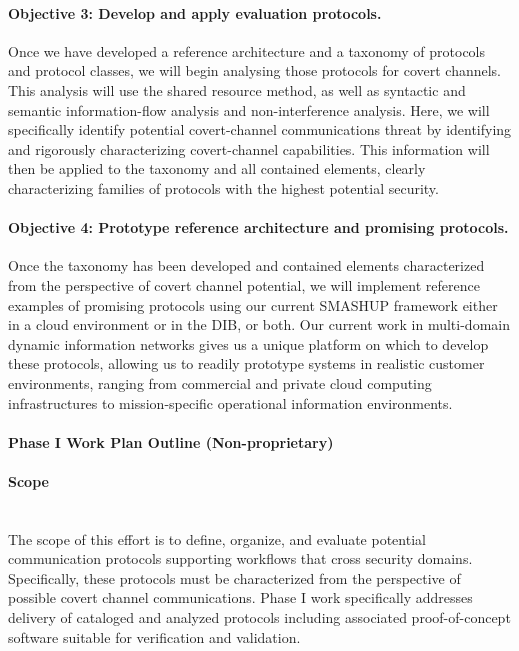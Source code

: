 \documentclass{sbir}
\begin{document}
\paragraph{Objective 3: Develop and apply evaluation protocols.} Once we have developed a reference architecture and a taxonomy of protocols and protocol classes, we will begin analysing those protocols for covert channels. This analysis will use the shared resource method, as well as syntactic and semantic information-flow analysis and non-interference analysis. Here, we will specifically identify potential covert-channel communications threat by identifying and rigorously characterizing covert-channel capabilities. This information will then be applied to the taxonomy and all contained elements, clearly characterizing families of protocols with the highest potential security.

\paragraph{Objective 4: Prototype reference architecture and promising protocols.}  Once the taxonomy has been developed and contained elements characterized from the perspective of covert channel potential, we will implement reference examples of promising protocols using our current SMASHUP framework either in a cloud environment or in the DIB, or both. Our current work in multi-domain dynamic information networks gives us a unique platform on which to develop these protocols, allowing us to readily prototype systems in realistic customer environments, ranging from commercial and private cloud computing infrastructures to mission-specific operational information environments.


\newpage 
\lfoot{}
\cfoot{\color{LeTigre}\vspace*{-1.25em}{\scshape\fromproposaltitle}~\\ \rm\thepage}

\paragraph{Phase I Work Plan Outline (Non-proprietary)}
\paragraph{Scope}~\\
The scope of this effort is to define, organize, and evaluate potential communication protocols supporting workflows that cross security domains. Specifically, these protocols must be characterized from the perspective of possible covert channel communications. Phase I work specifically addresses delivery of cataloged and analyzed protocols including associated proof-of-concept software suitable for verification and validation.
\end{document}
